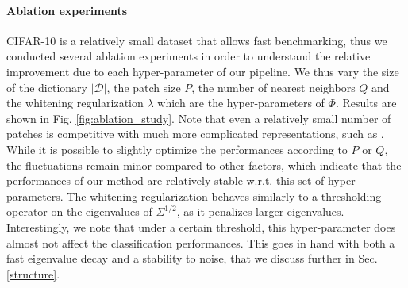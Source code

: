 \documentclass{article} %
\begin{document}
\paragraph{Ablation experiments}
CIFAR-10 is a relatively small dataset that allows fast benchmarking, thus we conducted several ablation experiments in order to understand the relative improvement due to each hyper-parameter of our pipeline. We thus vary the size of the dictionary $|\mathcal{D}|$, the patch size $P$, the number of nearest neighbors $Q$ and the whitening regularization $\lambda$ which are the hyper-parameters of $\Phi$. Results are shown in Fig. \ref{fig:ablation_study}. Note that even a relatively small number of patches is competitive with much more complicated representations, such as \citet{Oyallon_2015_CVPR}.
While it is possible to slightly optimize the performances according to $P$ or $Q$,  the fluctuations remain minor compared to other factors, which indicate that the performances of our method are relatively stable w.r.t. this set of hyper-parameters. The whitening regularization behaves similarly to a thresholding operator on the eigenvalues of $\Sigma^{1/2}$, as it penalizes larger eigenvalues. Interestingly, we note that under a certain threshold, this hyper-parameter  does almost not affect the classification performances. This goes in hand with both a fast eigenvalue decay and a stability to noise, that we discuss further in Sec. \ref{structure}.

\end{document}
